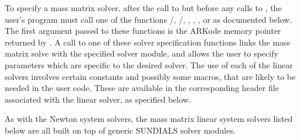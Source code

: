 \documentclass[letterpaper,10pt,english]{sphinxmanual}
\begin{document}
To specify a mass matrix solver, after the call to
{\hyperref[c_interface/User_callable:ARKodeCreate]{}} but before any calls to {\hyperref[c_interface/User_callable:ARKode]{}},
the user's program must call one of the functions
{\hyperref[c_interface/User_callable:ARKMassDense]{}}/{\hyperref[c_interface/User_callable:ARKMassLapackDense]{}},
{\hyperref[c_interface/User_callable:ARKMassBand]{}}/{\hyperref[c_interface/User_callable:ARKMassLapackBand]{}},
{\hyperref[c_interface/User_callable:ARKMassSpgmr]{}}, {\hyperref[c_interface/User_callable:ARKMassSpbcg]{}},
{\hyperref[c_interface/User_callable:ARKMassSptfqmr]{}}, {\hyperref[c_interface/User_callable:ARKMassSpfgmr]{}} or
{\hyperref[c_interface/User_callable:ARKMassPcg]{}} as documented below. The first argument passed
to these functions is the ARKode memory pointer returned by
{\hyperref[c_interface/User_callable:ARKodeCreate]{}}. A call to one of these solver specification
functions links the mass matrix solve with the specified solver
module, and allows the user to specify parameters which are specific
to the desired solver.  The use of each of the linear solvers involves
certain constants and possibly some macros, that are likely to be
needed in the user code. These are available in the corresponding
header file associated with the linear solver, as specified below.

As with the Newton system solvers, the mass matrix linear system
solvers listed below are all built on top of generic SUNDIALS solver
modules.
\end{document}
